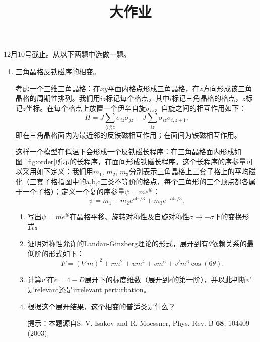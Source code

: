 \documentclass[12pt,aps,pra,notitlepage]{revtex4-1}
\begin{document}
\title{大作业}
\maketitle
\begin{center}
  12月10号截止。从以下两题中选做一题。
\end{center}
\begin{enumerate}
  \item 三角晶格反铁磁序的相变。

  考虑一个三维三角晶格：在$xy$平面内格点形成三角晶格，在$z$方向形成该三角晶格的周期性排列。我们用$iz$标记每个格点，其中$i$标记三角晶格的格点，$z$标记$z$坐标。在每个格点上放置一个伊辛自旋$\sigma_{iz}$，自旋之间的相互作用如下：
  \[H=J\sum_{\langle ij\rangle z}\sigma_{iz}\sigma_{jz}-J\sum_{iz}\sigma_{iz}\sigma_{i,z+1}.\]
  即在三角晶格面内为最近邻的反铁磁相互作用；在面间为铁磁相互作用。

  这样一个模型在低温下会形成一个反铁磁长程序：在三角晶格面内形成如图~\ref{fig:order}所示的长程序，在面间形成铁磁长程序。这个长程序的序参量可以采用如下定义：我们用$m_1$, $m_2$, $m_3$分别表示三角晶格上三套子格上的平均磁化（三套子格指图中的a,b,c三类不等价的格点，每个三角形的三个顶点都各属于一个子格）；定义一个复的序参量$\psi=me^{i\theta}$：
  \[\psi=m_1+m_2e^{i4\pi/3}+m_3e^{-i4\pi/3}.\]

  \begin{enumerate}
    \item 写出$\psi=me^{i\theta}$在晶格平移、旋转对称性及自旋对称性$\sigma\rightarrow-\sigma$下的变换形式。
    \item 证明对称性允许的Landau-Ginzberg理论的形式，展开到有$\theta$依赖关系的最低阶的形式如下：
    \[F=(\nabla m)^2+rm^2+um^4+vm^6+v'm^6\cos(6\theta).\]
    \item 计算$v'$在$\epsilon=4-D$展开下的标度维数（展开到$\epsilon$的第一阶），并以此判断$v'$是relevant还是irrelevant perturbation。
    \item 根据这个展开结果，这个相变的普适类是什么？

    提示：本题源自S. V. Isakov and R. Moessner, Phys. Rev. B {\bf 68}, 104409 (2003).
  \end{enumerate}


\end{enumerate}
\end{document}
